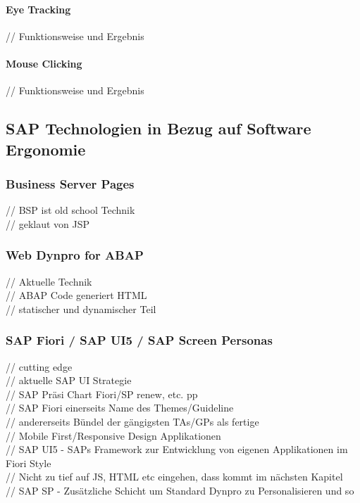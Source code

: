 \documentclass[12pt,a4paper,bibliography=totocnumbered,listof=totocnumbered]{scrartcl}
\begin{document}
\paragraph{Eye Tracking}
// Funktionsweise und Ergebnis\\

\paragraph{Mouse Clicking}
// Funktionsweise und Ergebnis\\

\subsection{SAP Technologien in Bezug auf Software Ergonomie}
\subsubsection{Business Server Pages}
// \ac{BSP} ist old school Technik\\
// geklaut von \ac{JSP}\\

\subsubsection{Web Dynpro for ABAP}
// Aktuelle Technik\\
// ABAP Code generiert HTML\\
// statischer und dynamischer Teil\\

\subsubsection{SAP Fiori / SAP UI5 / SAP Screen Personas}
// cutting edge\\
// aktuelle SAP UI Strategie\\
// SAP Präsi Chart Fiori/SP renew, etc. pp\\
// SAP Fiori einerseits Name des Themes/Guideline\\
// andererseits Bündel der gängigsten TAs/GPs als fertige\\
// Mobile First/Responsive Design Applikationen\\
// SAP UI5 - SAPs Framework zur Entwicklung von eigenen Applikationen im Fiori Style\\
// Nicht zu tief auf JS, HTML etc eingehen, dass kommt im nächsten Kapitel\\
// SAP SP - Zusätzliche Schicht um Standard Dynpro zu Personalisieren und so\\
\pagebreak
\end{document}
